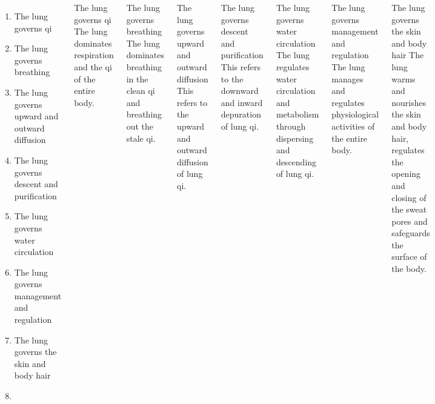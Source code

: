 \documentclass[
	11pt, %
]{beamer}
\theoremstyle{newblock}
\begin{document}
\begin{frame}
	\begin{columns}
		\begin{enumerate}
			\item The lung governs qi
			\item The lung governs breathing
			\item The lung governs upward and outward diffusion
			\item The lung governs descent and purification
			\item The lung governs water circulation
			\item The lung governs management and regulation
			\item The lung governs the skin and body hair
			\item 
		\end{enumerate}
			\begin{block}{The lung governs qi}
				The lung dominates respiration and the qi of the entire body.
			\end{block}
			\begin{block}{The lung governs breathing}
				The lung dominates breathing in the clean qi and breathing out the stale qi. 
			\end{block}
			\begin{block}{The lung governs upward and outward diffusion}
				This refers to the upward and outward diffusion of lung qi. 
			\end{block}
			\begin{block}{The lung governs descent and purification}
				This refers to the downward and inward depuration of lung qi. 
			\end{block}
			\begin{block}{The lung governs water circulation}
				The lung regulates water circulation and metabolism through dispersing and descending of lung qi.
			\end{block}
			\begin{block}{The lung governs management and regulation}
				The lung manages and regulates physiological activities of the entire body.
			\end{block}
			\begin{block}{The lung governs the skin and body hair}
				The lung warms and nourishes the skin and body hair, regulates the opening and closing of the sweat pores and safeguards the surface of the body. 
			\end{block}
	\end{columns}
\end{frame}
\end{document}
